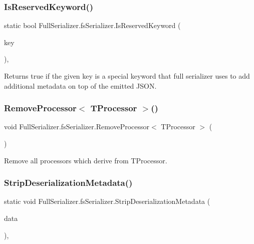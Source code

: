 \subsubsection{\texorpdfstring{Is\+Reserved\+Keyword()}{IsReservedKeyword()}}
{\footnotesize\ttfamily static bool Full\+Serializer.\+fs\+Serializer.\+Is\+Reserved\+Keyword (\begin{DoxyParamCaption}\item[{string}]{key }\end{DoxyParamCaption})\hspace{0.3cm}{\ttfamily [inline]}, {\ttfamily [static]}}



Returns true if the given key is a special keyword that full serializer uses to add additional metadata on top of the emitted J\+S\+ON. 

\mbox{\label{class_full_serializer_1_1fs_serializer_ae4ee8d86aefa7d639f2c63552ad2ec3a}} 
\subsubsection{\texorpdfstring{Remove\+Processor$<$ T\+Processor $>$()}{RemoveProcessor< TProcessor >()}}
{\footnotesize\ttfamily void Full\+Serializer.\+fs\+Serializer.\+Remove\+Processor$<$ T\+Processor $>$ (\begin{DoxyParamCaption}{ }\end{DoxyParamCaption})\hspace{0.3cm}{\ttfamily [inline]}}



Remove all processors which derive from T\+Processor. 

\mbox{\label{class_full_serializer_1_1fs_serializer_a9adc1e64a01745e7cad713f39dc27630}} 
\subsubsection{\texorpdfstring{Strip\+Deserialization\+Metadata()}{StripDeserializationMetadata()}}
{\footnotesize\ttfamily static void Full\+Serializer.\+fs\+Serializer.\+Strip\+Deserialization\+Metadata (\begin{DoxyParamCaption}\item[{ref \hyperlink{class_full_serializer_1_1fs_data}{fs\+Data}}]{data }\end{DoxyParamCaption})\hspace{0.3cm}{\ttfamily [inline]}, {\ttfamily [static]}}



